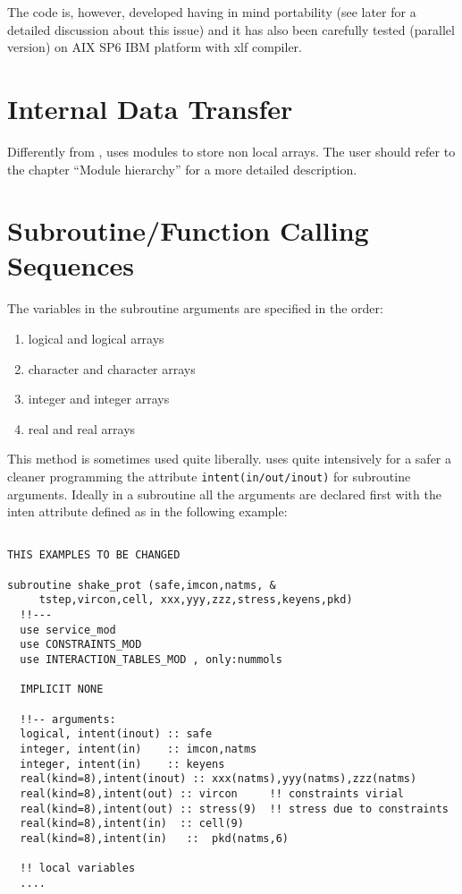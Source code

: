 The code is, however, developed having in mind portability (see later for a detailed
discussion about this issue) and it has also been carefully tested (parallel version) on AIX SP6 IBM platform with xlf  compiler.


\section{Internal Data Transfer}
Differently from \D, \PR uses modules to store non local arrays. The user
should refer to the chapter ``Module hierarchy'' for a more detailed
description.

\section{Subroutine/Function Calling Sequences}

The variables in the subroutine arguments are specified in the order:
\begin{enumerate}
\item logical and logical arrays
\item character and character arrays
\item integer and integer arrays
\item real and real arrays
\end{enumerate}
This method is sometimes used quite liberally. 
\PR uses quite intensively for a safer a cleaner programming the \fort
attribute \verb=intent(in/out/inout)= for subroutine arguments.
Ideally in a subroutine all the arguments are declared first with the
inten attribute defined as in the following example:

\begin{verbatim}

THIS EXAMPLES TO BE CHANGED 

subroutine shake_prot (safe,imcon,natms, &
     tstep,vircon,cell, xxx,yyy,zzz,stress,keyens,pkd)
  !!---
  use service_mod
  use CONSTRAINTS_MOD
  use INTERACTION_TABLES_MOD , only:nummols

  IMPLICIT NONE

  !!-- arguments:
  logical, intent(inout) :: safe
  integer, intent(in)    :: imcon,natms
  integer, intent(in)    :: keyens
  real(kind=8),intent(inout) :: xxx(natms),yyy(natms),zzz(natms)
  real(kind=8),intent(out) :: vircon     !! constraints virial
  real(kind=8),intent(out) :: stress(9)  !! stress due to constraints
  real(kind=8),intent(in)  :: cell(9)
  real(kind=8),intent(in)   ::  pkd(natms,6)

  !! local variables
  ....
\end{verbatim}


